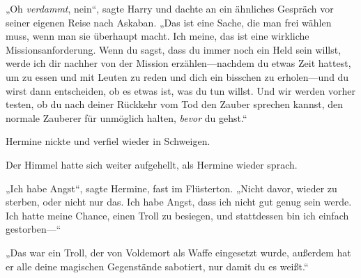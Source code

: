 „Oh \emph{verdammt}, nein“, sagte Harry und dachte an ein ähnliches Gespräch vor seiner eigenen Reise nach Askaban.
„Das ist eine Sache, die man frei wählen muss, wenn man sie überhaupt macht. Ich meine, das ist eine wirkliche Missionsanforderung. Wenn du sagst, dass du immer noch ein Held sein willst, werde ich dir nachher von der Mission erzählen—nachdem du etwas Zeit hattest, um zu essen und mit Leuten zu reden und dich ein bisschen zu erholen—und du wirst dann entscheiden, ob es etwas ist, was du tun willst. Und wir werden vorher testen, ob du nach deiner Rückkehr vom Tod den Zauber sprechen kannst, den normale Zauberer für unmöglich halten, \emph{bevor} du gehst.“

Hermine nickte und verfiel wieder in Schweigen.

Der Himmel hatte sich weiter aufgehellt, als Hermine wieder sprach.

„Ich habe Angst“, sagte Hermine, fast im Flüsterton. „Nicht davor, wieder zu sterben, oder nicht nur das. Ich habe Angst, dass ich nicht gut genug sein werde. Ich hatte meine Chance, einen Troll zu besiegen, und stattdessen bin ich einfach gestorben—“

„Das war ein Troll, der von Voldemort als Waffe eingesetzt wurde, außerdem hat er alle deine magischen Gegenstände sabotiert, nur damit du es weißt.“

